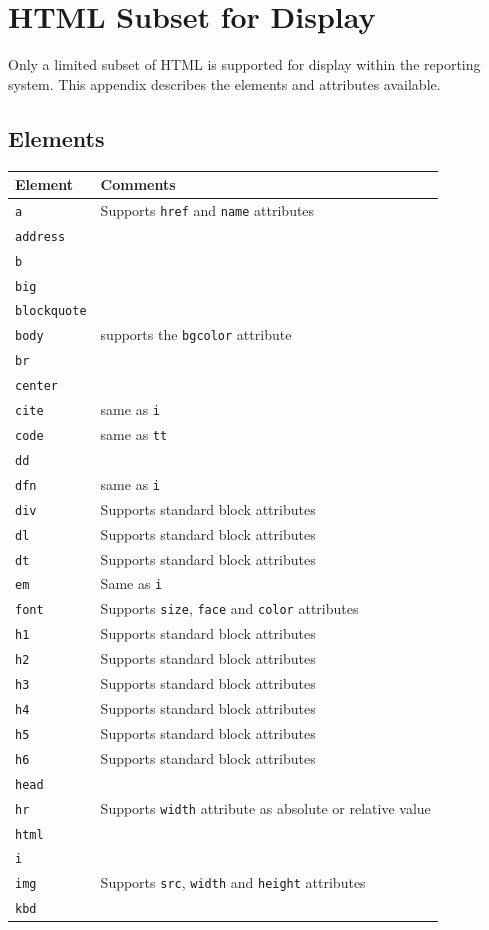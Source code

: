 \documentclass[a4paper,10pt]{book}
\begin{document}
\chapter{HTML Subset for Display}
\label{app_html_subset}
Only a limited subset of HTML is supported for display within the reporting system. This appendix describes the elements and attributes available.

\section{Elements}
\begin{tabular}{p{3cm} p{10.6cm}}
\hline
\textbf{Element} & \textbf{Comments} \\
\hline
\verb|a| & Supports \verb|href| and \verb|name| attributes\\
\verb|address| &\\
\verb|b|&\\
\verb|big|&\\
\verb|blockquote|&\\
\verb|body|& supports the \verb|bgcolor| attribute\\
\verb|br|&\\
\verb|center|&\\
\verb|cite|& same as \verb|i|\\
\verb|code|& same as \verb|tt|\\
\verb|dd|&\\
\verb|dfn|& same as \verb|i|\\
\verb|div| & Supports standard block attributes\\
\verb|dl| & Supports standard block attributes\\
\verb|dt| & Supports standard block attributes\\
\verb|em| & Same as \verb|i|\\
\verb|font| & Supports \verb|size|, \verb|face| and \verb|color| attributes\\
\verb|h1| & Supports standard block attributes\\
\verb|h2| & Supports standard block attributes\\
\verb|h3| & Supports standard block attributes\\
\verb|h4| & Supports standard block attributes\\
\verb|h5| & Supports standard block attributes\\
\verb|h6| & Supports standard block attributes\\
\verb|head|&\\
\verb|hr|&Supports \verb|width| attribute as absolute or relative value\\
\verb|html| &\\
\verb|i| &\\
\verb|img| & Supports \verb|src|, \verb|width| and \verb|height| attributes\\
\verb|kbd| &\\
\hline
\end{tabular}
\end{document}
